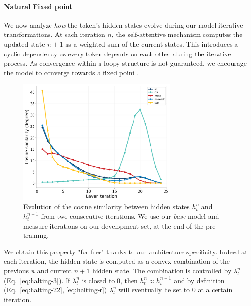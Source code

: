 
\paragraph{Natural Fixed point} We now analyze \textit{how} the token's hidden states evolve during our model iterative transformations. At each iteration $n$, the self-attentive mechanism \parencite{vaswani_17} computes the updated state $n+1$ as a weighted sum of the current states. This introduces a cyclic dependency as every token depends on each other during the iterative process. As convergence within a loopy structure is not guaranteed, we encourage the model to converge towards a fixed point \parencite{bai_19}.

\begin{figure}[!htb]
\begin{center}
\includegraphics[width=8cm]{images/cosine-base-v3 (1).png}
\end{center}
\caption{Evolution of the cosine similarity between hidden states $h^n_t$ and $h^{n+1}_t$ from two consecutive iterations. We use our \textit{base} model and measure iterations on our development set, at the end of the pre-training.}
\end{figure}

We obtain this property "for free" thanks to our architecture specificity. Indeed at each iteration, the hidden state is computed as a convex combination of the previous $n$ and current $n+1$ hidden state. The combination is controlled by $\lambda^n_t$  (Eq.~\ref{eq:halting-3}). If $\lambda^n_t$ is closed to $0$, then $h^n_t \approx h^{n+1}_t$ and by definition (Eq.~\ref{eq:halting-22}, \ref{eq:halting-r}) $\lambda^n_t$ will eventually be set to $0$ at a certain iteration.

